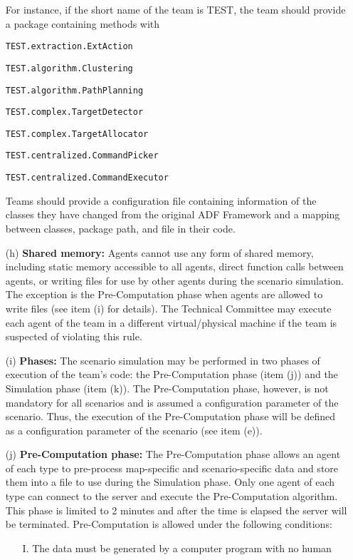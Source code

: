 \documentclass{article}
\begin{document}
\begin{itemize}
\normalsize
For instance, if the short name of the team is TEST, the team should provide a 
package containing methods with

\small
\texttt{TEST.extraction.ExtAction}

\texttt{TEST.algorithm.Clustering}

\texttt{TEST.algorithm.PathPlanning}

\texttt{TEST.complex.TargetDetector}

\texttt{TEST.complex.TargetAllocator}

\texttt{TEST.centralized.CommandPicker}

\texttt{TEST.centralized.CommandExecutor}

\normalsize
Teams should provide a configuration file containing information of the classes 
they have changed from the original ADF Framework and a mapping between classes,
package path, and file in their code.
\item[(h)] \textbf{Shared memory:} Agents cannot use any form of shared memory, 
including static memory accessible to all agents, direct function calls between 
agents, or writing files for use by other agents during the scenario simulation.
The exception is the Pre-Computation phase when agents are allowed to write
files (see item (i) for details). The Technical Committee may execute each agent
of the team in a different virtual/physical machine if the team is suspected of
violating this rule.
\item[(i)] \textbf{Phases:} The scenario simulation may be performed in two
phases of execution of the team's code: the Pre-Computation phase (item (j)) and
the Simulation phase (item (k)). The Pre-Computation phase, however, is not
mandatory for all scenarios and is assumed a configuration parameter of the
scenario. Thus, the execution of the Pre-Computation phase will be defined as a
configuration parameter of the scenario (see item (e)).
\item[(j)] \textbf{Pre-Computation phase:} The Pre-Computation phase allows an 
agent of each type to pre-process map-specific and scenario-specific data and 
store them into a file to use during the Simulation phase. Only one agent of 
each type can connect to the server and execute the Pre-Computation algorithm. 
This phase is limited to 2 minutes and after the time is elapsed the server 
will be terminated. Pre-Computation is allowed under the following conditions:
\begin{itemize}
\item[I.] The data must be generated by a computer program with no human 

\end{itemize}
\end{itemize}
\end{document}
